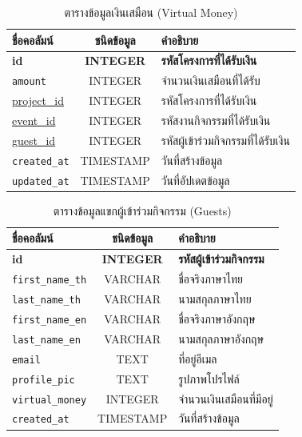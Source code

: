 \begin{table}[h]
    \centering
    \begin{tabular}{|l|c|l|}
        \hline
        ชื่อคอลัมน์                 & ชนิดข้อมูล          & คำอธิบาย                      \\ \hline
        \textbf{id}             & \textbf{INTEGER} & \textbf{รหัสโครงการที่ได้รับเงิน} \\ \hline
        \verb |amount|          & INTEGER          & จำนวนเงินเสมือนที่ได้รับ           \\ \hline
        \underline{project\_id} & INTEGER          & รหัสโครงการที่ได้รับเงิน          \\ \hline
        \underline{event\_id}   & INTEGER          & รหัสงานกิจกรรมที่ได้รับเงิน        \\ \hline
        \underline{guest\_id}   & INTEGER          & รหัสผู้เข้าร่วมกิจกรรมที่ได้รับเงิน    \\ \hline
        \verb |created_at|      & TIMESTAMP        & วันที่สร้างข้อมูล                 \\ \hline
        \verb |updated_at|      & TIMESTAMP        & วันที่อัปเดตข้อมูล                \\ \hline
    \end{tabular}
    \caption{ตารางข้อมูลเงินเสมือน (Virtual Money)}
    \label{tab:virtual_money_data}
\end{table}

\begin{table}[h]
    \centering
    \begin{tabular}{|l|c|l|}
        \hline
        ชื่อคอลัมน์               & ชนิดข้อมูล          & คำอธิบาย                    \\ \hline
        \textbf{id}           & \textbf{INTEGER} & \textbf{รหัสผู้เข้าร่วมกิจกรรม} \\ \hline
        \verb |first_name_th| & VARCHAR          & ชื่อจริงภาษาไทย              \\ \hline
        \verb |last_name_th|  & VARCHAR          & นามสกุลภาษาไทย             \\ \hline
        \verb |first_name_en| & VARCHAR          & ชื่อจริงภาษาอังกฤษ            \\ \hline
        \verb |last_name_en|  & VARCHAR          & นามสกุลภาษาอังกฤษ           \\ \hline
        \verb |email|         & TEXT             & ที่อยู่อีเมล                   \\ \hline
        \verb |profile_pic|   & TEXT             & รูปภาพโปรไฟล์               \\ \hline
        \verb |virtual_money| & INTEGER          & จำนวนเงินเสมือนที่มีอยู่          \\ \hline
        \verb |created_at|    & TIMESTAMP        & วันที่สร้างข้อมูล               \\ \hline
    \end{tabular}
    \caption{ตารางข้อมูลแขกผู้เข้าร่วมกิจกรรม (Guests)}
    \label{tab:guest_data}
\end{table}

